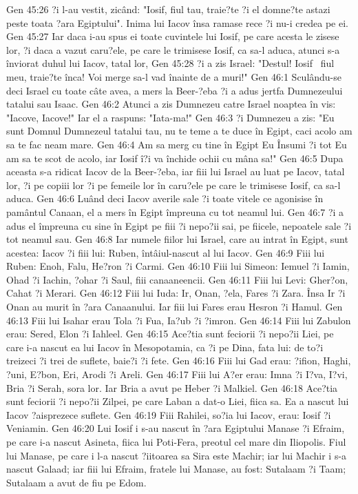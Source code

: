 Gen 45:26  ?i l-au vestit, zicând: "Iosif, fiul tau, traie?te ?i el domne?te astazi peste toata ?ara Egiptului". Inima lui Iacov însa ramase rece ?i nu-i credea pe ei.
Gen 45:27  Iar daca i-au spus ei toate cuvintele lui Iosif, pe care acesta le zisese lor, ?i daca a vazut caru?ele, pe care le trimisese Iosif, ca sa-l aduca, atunci s-a înviorat duhul lui Iacov, tatal lor,
Gen 45:28  ?i a zis Israel: "Destul! Iosif  fiul meu, traie?te înca! Voi merge sa-l vad înainte de a muri!"
Gen 46:1  Sculându-se deci Israel cu toate câte avea, a mers la Beer-?eba ?i a adus jertfa Dumnezeului tatalui sau Isaac.
Gen 46:2  Atunci a zis Dumnezeu catre Israel noaptea în vis: "Iacove, Iacove!" Iar el a raspuns: "Iata-ma!"
Gen 46:3  ?i Dumnezeu a zis: "Eu sunt Domnul Dumnezeul tatalui tau, nu te teme a te duce în Egipt, caci acolo am sa te fac neam mare.
Gen 46:4  Am sa merg cu tine în Egipt Eu Însumi ?i tot Eu am sa te scot de acolo, iar Iosif î?i va închide ochii cu mâna sa!"
Gen 46:5  Dupa aceasta s-a ridicat Iacov de la Beer-?eba, iar fiii lui Israel au luat pe Iacov, tatal lor, ?i pe copiii lor ?i pe femeile lor în caru?ele pe care le trimisese Iosif, ca sa-l aduca.
Gen 46:6  Luând deci Iacov averile sale ?i toate vitele ce agonisise în pamântul Canaan, el a mers în Egipt împreuna cu tot neamul lui.
Gen 46:7  ?i a adus el împreuna cu sine în Egipt pe fiii ?i nepo?ii sai, pe fiicele, nepoatele sale ?i tot neamul sau.
Gen 46:8  Iar numele fiilor lui Israel, care au intrat în Egipt, sunt acestea: Iacov ?i fiii lui: Ruben, întâiul-nascut al lui Iacov.
Gen 46:9  Fiii lui Ruben: Enoh, Falu, He?ron ?i Carmi.
Gen 46:10  Fiii lui Simeon: Iemuel ?i Iamin, Ohad ?i Iachin, ?ohar ?i Saul, fiii canaaneencii.
Gen 46:11  Fiii lui Levi: Gher?on, Cahat ?i Merari.
Gen 46:12  Fiii lui Iuda: Ir, Onan, ?ela, Fares ?i Zara. Însa Ir ?i Onan au murit în ?ara Canaanului. Iar fiii lui Fares erau Hesron ?i Hamul.
Gen 46:13  Fiii lui Isahar erau Tola ?i Fua, Ia?ub ?i ?imron.
Gen 46:14  Fiii lui Zabulon erau: Sered, Elon ?i Iahleel.
Gen 46:15  Ace?tia sunt feciorii ?i nepo?ii Liei, pe care i-a nascut ea lui Iacov în Mesopotamia, ca ?i pe Dina, fata lui: de to?i treizeci ?i trei de suflete, baie?i ?i fete.
Gen 46:16  Fiii lui Gad erau: ?ifion, Haghi, ?uni, E?bon, Eri, Arodi ?i Areli.
Gen 46:17  Fiii lui A?er erau: Imna ?i I?va, I?vi, Bria ?i Serah, sora lor. Iar Bria a avut pe Heber ?i Malkiel.
Gen 46:18  Ace?tia sunt feciorii ?i nepo?ii Zilpei, pe care Laban a dat-o Liei, fiica sa. Ea a nascut lui Iacov ?aisprezece suflete.
Gen 46:19  Fiii Rahilei, so?ia lui Iacov, erau: Iosif ?i Veniamin.
Gen 46:20  Lui Iosif i s-au nascut în ?ara Egiptului Manase ?i Efraim, pe care i-a nascut Asineta, fiica lui Poti-Fera, preotul cel mare din Iliopolis. Fiul lui Manase, pe care i l-a nascut ?iitoarea sa Sira este Machir; iar lui Machir i s-a nascut Galaad; iar fiii lui Efraim, fratele lui Manase, au fost: Sutalaam ?i Taam; Sutalaam a avut de fiu pe Edom.
